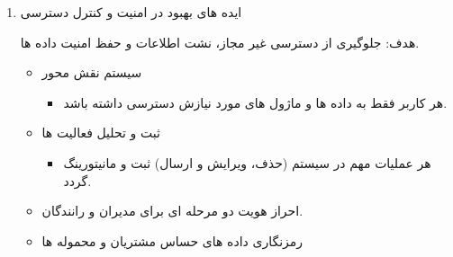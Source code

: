\documentclass[12pt,a4paper]{report}
\begin{document}
\begin{enumerate}
\begin{itemize}
\end{itemize}
\item ایده های بهبود در امنیت و کنترل دسترسی

هدف: جلوگیری از دسترسی غیر مجاز، نشت اطلاعات و حفظ امنیت داده ها.

\begin{itemize}
	\item 	سیستم نقش محور
	\begin{itemize}
		\item 
		هر کاربر فقط به داده ها و ماژول های مورد نیازش دسترسی داشته باشد.
	\end{itemize}
	\item 	ثبت و تحلیل  فعالیت ها
	\begin{itemize}
		\item 
هر عملیات مهم در سیستم (حذف، ویرایش و ارسال) ثبت و مانیتورینگ گردد.
	\end{itemize}
	\item 
احراز هویت دو مرحله ای برای مدیران و رانندگان.
	\item 
	رمزنگاری داده های حساس مشتریان و محموله ها
\end{itemize}
\end{enumerate}
\newpage
\end{document}
